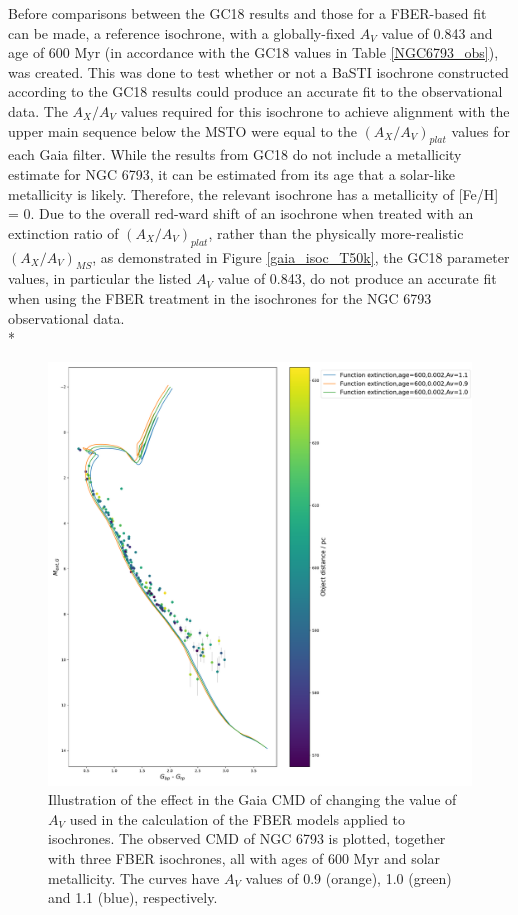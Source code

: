 \documentclass[12pt, a4paper]{report}
\begin{document}
Before comparisons between the GC18 results and those for a FBER-based fit can be made, a reference isochrone, with a globally-fixed $A_{V}$ value of 0.843 and age of 600 Myr (in accordance with the GC18 values in Table \ref{NGC6793_obs}), was created. This was done to test whether or not a BaSTI isochrone constructed according to the GC18 results could produce an accurate fit to the observational data. The $A_{X}/A_{V}$ values required for this isochrone to achieve alignment with the upper main sequence below the MSTO were equal to the $(A_{X}/A_{V})_{plat}$ values for each Gaia filter. While the results from GC18 do not include a metallicity estimate for NGC 6793, it can be estimated from its age that a solar-like metallicity is likely. Therefore, the relevant isochrone has a metallicity of [Fe/H] = 0. Due to the overall red-ward shift of an isochrone when treated with an extinction ratio of $(A_{X}/A_{V})_{plat}$, rather than the physically more-realistic $(A_{X}/A_{V})_{MS}$, as demonstrated in Figure \ref{gaia_isoc_T50k}, the GC18 parameter values, in particular the listed $A_{V}$ value of 0.843, do not produce an accurate fit when using the FBER treatment in the isochrones for the NGC 6793 observational data.\\*


\begin{figure}[h!]
\begin{center}
\includegraphics[width=1.0\textwidth]{../NGC_6793_CMD_FeH_0p002_Av_0p9_1p0_1p1_600Myr_isochrones_func_errorbars_T5k.pdf}
\caption{Illustration of the effect in the Gaia CMD of changing the value of $A_{V}$ used in the calculation of the FBER models applied to isochrones. The observed CMD of NGC 6793 is plotted, together with three FBER isochrones, all with ages of 600 Myr and solar metallicity. The curves have $A_{V}$ values of 0.9 (orange), 1.0 (green) and 1.1 (blue), respectively.}
\label{NGC_6793_Av_var}
\end{center}
\end{figure}
\end{document}
